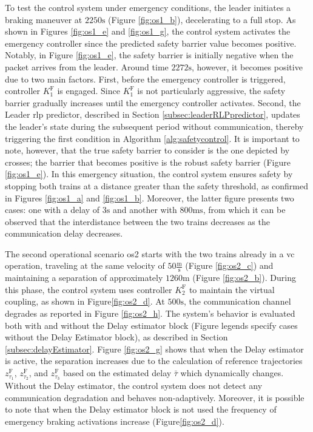 	To test the control system under emergency conditions, the leader initiates a braking maneuver at $2250\unit{\second}$ (Figure \ref{fig:os1_b}), decelerating to a full stop. As shown in Figures \ref{fig:os1_e} and \ref{fig:os1_g}, the control system activates the emergency controller since the predicted safety barrier value becomes positive. Notably, in Figure \ref{fig:os1_e}, the safety barrier is initially negative when the packet arrives from the leader. Around time \( 2272 \unit{\second} \), however, it becomes positive due to two main factors. First, before the emergency controller is triggered, controller $K_1^\mathrm{F}$ is engaged. Since $K_1^\mathrm{F}$ is not particularly aggressive, the safety barrier gradually increases until the emergency controller activates. Second, the Leader \gls{rlp} predictor, described in Section \ref{subsec:leaderRLPpredictor}, updates the leader's state during the subsequent period without communication, thereby triggering the first condition in Algorithm \ref{alg:safetycontrol}. It is important to note, however, that the true safety barrier to consider is the one depicted by crosses; the barrier that becomes positive is the robust safety barrier (Figure \ref{fig:os1_e}). In this emergency situation, the control system ensures safety by stopping both trains at a distance greater than the safety threshold, as confirmed in Figures \ref{fig:os1_a} and \ref{fig:os1_b}. Moreover, the latter figure presents two cases: one with a delay of $3 \unit{\second}$ and another with $800  \unit{\milli\second}$, from which it can be observed that the interdistance between the two trains decreases as the communication delay decreases.
	
	The second operational scenario \gls{os}2 starts with the two trains already in a \gls{vc} operation, traveling at the same velocity of $50 \frac{\unit{\meter}}{\unit{\second}}$ (Figure \ref{fig:os2_c}) and maintaining a separation of approximately $1260 \unit{\meter}$ (Figure \ref{fig:os2_b}). During this phase, the control system uses controller $K_2^\mathrm{F}$ to maintain the virtual coupling, as shown in Figure\tildeAdd\ref{fig:os2_d}. At $500\unit{\second}$, the communication channel degrades as reported in Figure \ref{fig:os2_h}. The system’s behavior is evaluated both with and without the Delay estimator block (Figure legends specify cases without the Delay Estimator block), as described in Section \ref{subsec:delayEstimator}. Figure \ref{fig:os2_g} shows that when the Delay estimator is active, the separation increases due to the calculation of reference trajectories $z_{\tau_1}^\mathrm{F}$, $z_{\tau_2}^\mathrm{F}$, and $z_{\tau_3}^\mathrm{F}$ based on the estimated delay $\bar{\tau}$ which dynamically changes. Without the Delay estimator, the control system does not detect any communication degradation and behaves non-adaptively. Moreover, it is possible to note that when the Delay estimator block is not used the frequency of emergency braking activations increase (Figure\tildeAdd\ref{fig:os2_d}).
	
